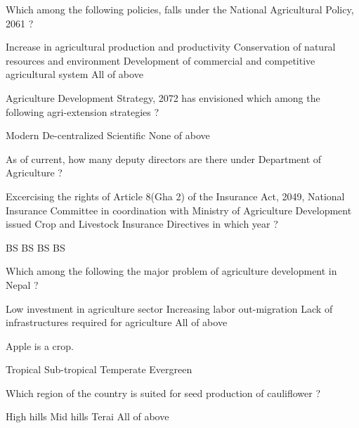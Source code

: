 \begin{questions}
\question Which among the following policies, falls under the National Agricultural Policy, 2061 ?
  \begin{choices}
  \choice Increase in agricultural production and productivity
  \choice Conservation of natural resources and environment
  \choice Development of commercial and competitive agricultural system
  \choice All of above
  \end{choices}

\question Agriculture Development Strategy, 2072 has envisioned which among the following agri-extension strategies ?
  \begin{choices}
  \choice Modern
  \choice De-centralized
  \choice Scientific
  \choice None of above
  \end{choices}

\question As of current, how many deputy directors are there under Department of Agriculture ?
  \begin{choices}
  \end{choices}

\question Excercising the rights of Article 8(Gha 2) of the Insurance Act, 2049, National Insurance Committee in coordination with Ministry of Agriculture Development issued Crop and Livestock Insurance Directives in which year ?
  \begin{choices}
   BS
   BS
   BS
   BS
  \end{choices}

\question Which among the following the major problem of agriculture development in Nepal ?
  \begin{choices}
  \choice Low investment in agriculture sector
  \choice Increasing labor out-migration
  \choice Lack of infrastructures required for agriculture
  \choice All of above
  \end{choices}

\question Apple is a \fillin[][3cm] crop.
  \begin{choices}
  \choice Tropical
  \choice Sub-tropical
  \CorrectChoice Temperate
  \choice Evergreen
  \end{choices}

\question Which region of the country is suited for seed production of cauliflower ?
  \begin{choices}
  \CorrectChoice High hills
  \choice Mid hills
  \choice Terai
  \choice All of above
  \end{choices}


\end{questions}
